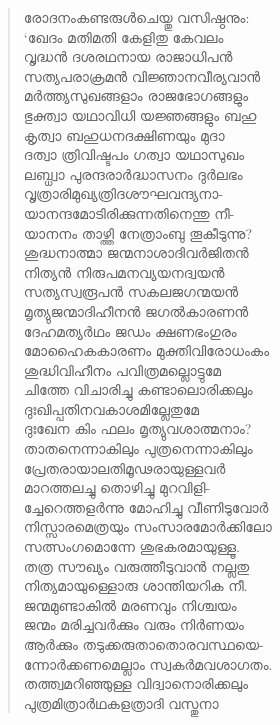 \begin{verse}
രോദനംകണ്ടരുള്‍ചെയ്തു വസിഷ്ഠനും:\\
‘ഖേദം മതിമതി കേളിതു കേവലം\\
വൃദ്ധന്‍ ദശരഥനായ രാജാധിപന്‍\\
സത്യപരാക്രമന്‍ വിജ്ഞാനവീര്യവാന്‍\\
മര്‍ത്ത്യസുഖങ്ങളാം രാജഭോഗങ്ങളും\\
ഭുക്ത്വാ യഥാവിധി യജ്ഞങ്ങളും ബഹു\\
കൃത്വാ ബഹുധനദക്ഷിണയും മുദാ\\
ദത്വാ ത്രിവിഷ്ടപം ഗത്വാ യഥാസുഖം\\
ലബ്ധ്വാ പുരന്ദരാര്‍ദ്ധാസനം ദുര്‍ലഭം\\
വൃത്രാരിമുഖ്യത്രിദശൗഘവന്ദ്യനാ-\\
യാനന്ദമോടിരിക്കുന്നതിനെന്തു നീ-\\
യാനനം താഴ്ത്തി നേത്രാംബു തൂകീടുന്നു?\\
ശുദ്ധനാത്മാ ജന്മനാശാദിവര്‍ജിതന്‍\\
നിത്യന്‍ നിരുപമനവ്യയനദ്വയന്‍\\
സത്യസ്വരൂപന്‍ സകലജഗന്മയന്‍\\
മൃത്യുജന്മാദിഹീനന്‍ ജഗല്‍കാരണന്‍\\
ദേഹമത്യര്‍ഥം ജഡം ക്ഷണഭംഗുരം\\
മോഹൈകകാരണം മുക്തിവിരോധംകം\\
ശുദ്ധിവിഹീനം പവിത്രമല്ലൊട്ടുമേ\\
ചിത്തേ വിചാരിച്ചു കണ്ടാലൊരിക്കലും\\
ദുഃഖിപ്പതിനവകാശമില്ലേതുമേ\\
ദുഃഖേന കിം ഫലം മൃത്യുവശാത്മനാം?\\
താതനെന്നാകിലും പുത്രനെന്നാകിലും\\
പ്രേതരായാലതിമൂഢരായുള്ളവര്‍\\
മാറത്തലച്ചു തൊഴിച്ചു മുറവിളി-\\
ച്ചേറെത്തളര്‍ന്നു മോഹിച്ചു വീണിടുവോര്‍\\
നിസ്സാരമെത്രയും സംസാരമോര്‍ക്കിലോ\\
സത്സംഗമൊന്നേ ശുഭകരമായുള്ളൂ.\\
തത്ര സൗഖ്യം വരുത്തീടുവാന്‍ നല്ലതു\\
നിത്യമായുള്ളൊരു ശാന്തിയറിക നീ.\\
ജന്മമുണ്ടാകില്‍ മരണവും നിശ്ചയം\\
ജന്മം മരിച്ചവര്‍ക്കും വരും നിര്‍ണയം\\
ആര്‍ക്കും തടുക്കരുതാതൊരവസ്ഥയെ-\\
ന്നോര്‍ക്കണമെല്ലാം സ്വകര്‍മവശാഗതം.\\
തത്ത്വമറിഞ്ഞുള്ള വിദ്വാനൊരിക്കലും\\
പുത്രമിത്രാര്‍ഥകളത്രാദി വസ്തുനാ\\

\end{verse}
